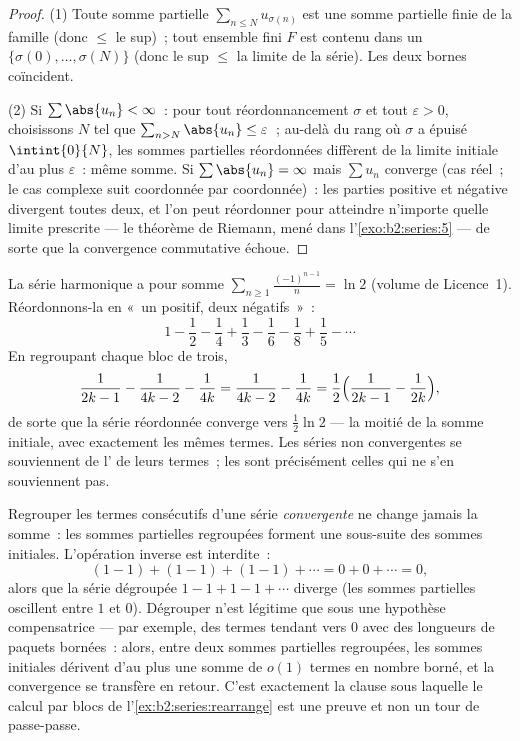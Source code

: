 \begin{proof}
(1) Toute somme partielle $\sum_{n \leq N} u_{\sigma(n)}$ est une
somme partielle finie de la famille (donc $\leq$ le sup)~; tout
ensemble fini $F$ est contenu dans un $\{\sigma(0), \dots,
\sigma(N)\}$ (donc le sup $\leq$ la limite de la série). Les deux
bornes coïncident.

(2) Si $\sum\abs{u_n} < \infty$~: pour tout réordonnancement $\sigma$
et tout $\varepsilon > 0$, choisissons $N$ tel que $\sum_{n >
N}\abs{u_n} \leq \varepsilon$~; au-delà du rang où $\sigma$ a épuisé
$\intint{0}{N}$, les sommes partielles réordonnées diffèrent de la
limite initiale d'au plus $\varepsilon$~: même somme. Si $\sum
\abs{u_n} = \infty$ mais $\sum u_n$ converge (cas réel~; le cas
complexe suit coordonnée par coordonnée)~: les parties positive et
négative divergent toutes deux, et l'on peut réordonner pour
atteindre n'importe quelle limite prescrite --- le théorème de
Riemann, mené dans l'\cref{exo:b2:series:5} --- de sorte que la
convergence commutative échoue.
\end{proof}

\begin{example}\label{ex:b2:series:rearrange}
La série harmonique  a pour somme
$\sum_{n\geq1}\frac{(-1)^{n-1}}{n} = \ln 2$ (volume de
Licence~1). Réordonnons-la en «~un positif, deux négatifs~»~:
\[
1 - \frac12 - \frac14 + \frac13 - \frac16 - \frac18 + \frac15 -
\cdots
\]
En regroupant chaque bloc de trois,
\[
\frac{1}{2k-1} - \frac{1}{4k-2} - \frac1{4k}
= \frac{1}{4k-2} - \frac{1}{4k}
= \frac12\Bigl(\frac{1}{2k-1} - \frac1{2k}\Bigr),
\]
de sorte que la série réordonnée converge vers $\frac12\ln 2$ --- la
moitié de la somme initiale, avec exactement les mêmes termes. Les
séries non  convergentes se souviennent de l' de
leurs termes~; les  sont précisément celles qui ne
s'en souviennent pas.
\end{example}

\begin{example}\label{ex:b2:series:grouping}
Regrouper les termes consécutifs d'une série \emph{convergente} ne
change jamais la somme~: les sommes partielles regroupées forment une
sous-suite des sommes initiales. L'opération inverse est interdite~:
\[
(1 - 1) + (1 - 1) + (1 - 1) + \cdots = 0 + 0 + \cdots = 0,
\]
alors que la série dégroupée $1 - 1 + 1 - 1 + \cdots$ diverge (les
sommes partielles oscillent entre $1$ et $0$). Dégrouper n'est
légitime que sous une hypothèse compensatrice --- par exemple, des
termes tendant vers $0$ avec des longueurs de paquets bornées~:
alors, entre deux sommes partielles regroupées, les sommes initiales
dérivent d'au plus une somme de $o(1)$ termes en nombre borné, et la
convergence se transfère en retour. C'est exactement la clause sous
laquelle le calcul par blocs de l'\cref{ex:b2:series:rearrange} est
une preuve et non un tour de passe-passe.
\end{example}

